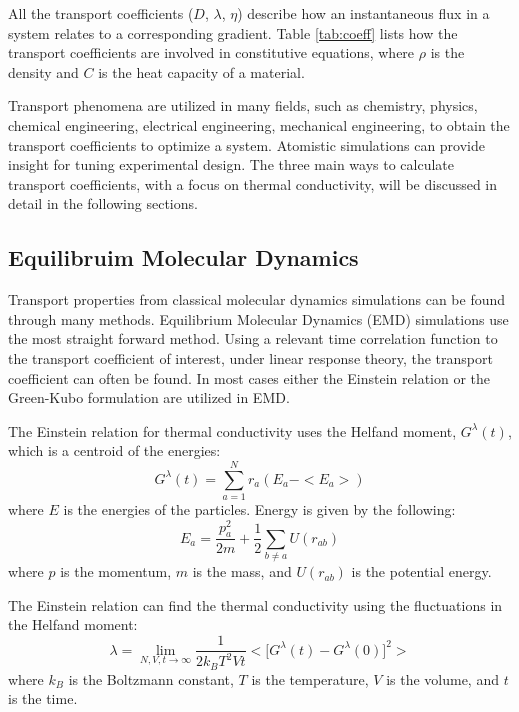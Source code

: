 All the transport coefficients ($D$, $\lambda$, $\eta$) describe how an instantaneous flux in a system relates to a corresponding gradient. Table \ref{tab:coeff} lists how the transport coefficients are involved in constitutive equations, where $\rho$ is the density and $C$ is the heat capacity of a material.

Transport phenomena are utilized in many fields, such as chemistry, physics, chemical engineering, electrical engineering, mechanical engineering, to obtain the transport coefficients to optimize a system. Atomistic simulations can provide insight for tuning experimental design. The three main ways to calculate transport coefficients, with a focus on thermal conductivity, will be discussed in detail in the following sections.

\subsection{Equilibruim Molecular Dynamics}
Transport properties from classical molecular dynamics simulations can be found through many methods. Equilibrium Molecular Dynamics (EMD) simulations use the most straight forward method. Using a relevant time correlation function to the transport coefficient of interest, under linear response theory, the transport coefficient can often be found.\cite{Heyes:1988ee,MASSOBRIO:1984bl,Helfand:1960os,Viscardy:2007rp,che:6888,kinaci:014106} In most cases either the Einstein relation or the Green-Kubo formulation are utilized in EMD.

The Einstein relation for thermal conductivity uses the Helfand moment, $G^\lambda (t)$, which is a centroid of the energies:
\begin{equation}
    G^\lambda (t) = \sum^{N}_{a=1} r_a (E_a - <E_a>)
\end{equation}
where $E$ is the energies of the particles. Energy is given by the following: 
\begin{equation}
    E_a = \frac{p_a^2}{2m} + \frac{1}{2}\sum_{b\neq a} U(r_{ab})
\end{equation}
where $p$ is the momentum, $m$ is the mass, and $U(r_{ab})$ is the potential energy.

The Einstein relation can  find the thermal conductivity using the fluctuations in the Helfand moment:
\begin{equation}
    \lambda = \lim_{N,V,t \rightarrow \infty} \frac{1}{2k_B T^2 Vt} \bigg< \Big[ G^\lambda (t) - G^\lambda (0) \Big]^2\bigg>
\end{equation}
where $k_B$ is the Boltzmann constant, $T$ is the temperature, $V$ is the volume, and $t$ is the time.

